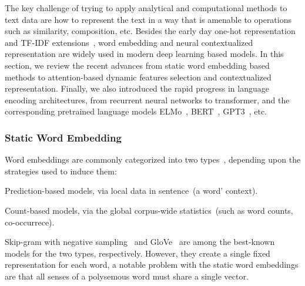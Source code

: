 The key challenge of trying to apply analytical and computational
methods to text data are how to represent the text in a way that is
amenable to operations such as similarity, composition, etc. Besides
the early day one-hot representation and TF-IDF
extensions~\citep{jones1972statistical}, word embedding and neural
contextualized representation are widely used in modern deep learning
based models. In this section, we review the recent advances from
static word embedding based methods to attention-based dynamic
features selection and contextualized representation. Finally, we also
introduced the rapid progress in language encoding architectures, from
recurrent neural networks to transformer, and the corresponding
pretrained language models ELMo~\citep{Peters:2018},
BERT~\citep{devlin2019bert}, GPT3~\cite{brown2020language}, etc.

\subsubsection{Static Word Embedding}
\label{sssec:bg:static-embedding}
Word embeddings are commonly categorized into two
types~\citep{Baroni:2014,pennington2014glove,li2015generative},
depending upon the strategies used to induce them:
\begin{inparaenum}[(1)]
\item Prediction-based models, via local data in sentence~(a word'
  context).
\item Count-based models, via the global corpus-wide statistics~(such
  as word counts, co-occurrece).
\end{inparaenum}

Skip-gram with negative sampling~\cite[SGNS,][]{mikolov13w2v} and
GloVe~\cite{pennington2014glove} are among the best-known models for
the two types, respectively. However, they create a single fixed
representation for each word, a notable problem with the static word
embeddings are that all senses of a polysemous word must share a single
vector.

